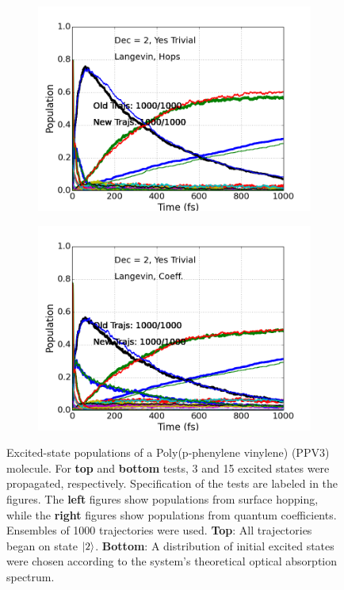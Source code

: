 \documentclass[letterpaper,12pt,titlepage]{article}
\begin{document}
\begin{appendix}
\begin{figure}[h]
	\begin{subfigure}[h]{0.425\textwidth}  
            \centering 
            \includegraphics[scale=.35]{ppv_es_traj_decohere2_yestrivial_langevin_realistic_hops_old_v_new_opt.png}
        \end{subfigure}
	\hspace{3mm}
        \begin{subfigure}[h]{0.425\textwidth}   
            \centering 
            \includegraphics[scale=.35]
{ppv_es_traj_decohere2_yestrivial_langevin_realistic_coeff_old_v_new_opt.png}
        \end{subfigure}
        \caption{\small Excited-state populations of a Poly(p-phenylene vinylene) (PPV3) molecule.  For {\textbf{top}} and {\textbf{bottom}} tests, 3 and 15 excited states were propagated, respectively.    Specification of the tests are labeled in the figures.  The {\textbf{left}} figures show populations from surface hopping, while the {\textbf{right}} figures show populations from quantum coefficients.  Ensembles of 1000 trajectories were used.  {\textbf{Top}}: All trajectories began on state $\ket{2}$.  {\textbf{Bottom}}: A distribution of initial excited states were chosen according to the system's theoretical optical absorption spectrum.} 

\end{figure}
\end{appendix}
\end{document}
